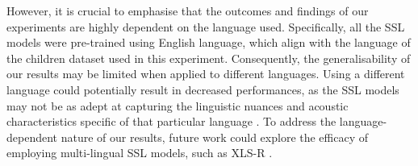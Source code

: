 However, it is crucial to emphasise that the outcomes and findings of our experiments are highly dependent on the language used. Specifically, all the SSL models were pre-trained using English language, which align with the language of the children dataset used in this experiment. Consequently, the generalisability of our results may be limited when applied to different languages. Using a different language could potentially result in decreased performances, as the SSL models may not be as adept at capturing the linguistic nuances and acoustic characteristics specific of that particular language \cite{phdthesis}. To address the language-dependent nature of our results, future work could explore the efficacy of employing multi-lingual SSL models, such as XLS-R \cite{babu2021xlsr}.
